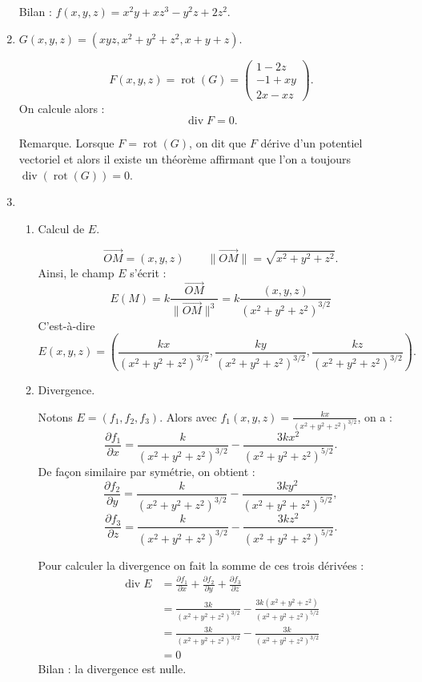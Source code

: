 \documentclass[11pt,a4paper]{article}
\theoremstyle{exostyle}
\newcommand{\diver}{\operatorname{div}}
\newcommand{\rot}{\operatorname{rot}}
\begin{document}
\begin{enumerate}
	Bilan : $f(x,y,z) = x^2y + xz^3 - y^2z + 2z^2$.
	
	\item $G(x,y,z) = (xyz, x^2+y^2+z^2, x+y+z)$. 
	
	\[
	F(x,y,z) = \rot(G) = \begin{pmatrix}
		1-2z \\ -1+xy \\ 2x-xz
	\end{pmatrix}.
	\]
	On calcule alors :
	\[\diver F = 0.\]
	
	Remarque. Lorsque $F = \rot(G)$, on dit que $F$ dérive d'un potentiel vectoriel et alors il existe un théorème affirmant que l'on a toujours $\diver (\rot(G)) = 0$.

	
	\item  
	\begin{enumerate}
		\item Calcul de $E$.
		
		\[
		\overrightarrow{OM} = (x, y, z) \qquad 
		\| \overrightarrow{OM} \| = \sqrt{x^2 + y^2 + z^2}.
		\]
		Ainsi, le champ \( E \) s'écrit :
		\[
		E(M) = k \frac{\overrightarrow{OM}}{\| \overrightarrow{OM} \|^3} = k \frac{(x, y, z)}{(x^2 + y^2 + z^2)^{3/2}}
		\]
		C'est-à-dire
		\[
		E(x, y, z) = \left( \frac{kx}{(x^2 + y^2 + z^2)^{3/2}}, \frac{ky}{(x^2 + y^2 + z^2)^{3/2}}, \frac{kz}{(x^2 + y^2 + z^2)^{3/2}} \right).
		\]
		
		\item Divergence.
		
		Notons $E = (f_1,f_2,f_3)$.
		Alors avec $f_1(x,y,z) =  \frac{kx}{(x^2 + y^2 + z^2)^{3/2}}$, on a :
		\[
		\frac{\partial f_1}{\partial x} 
		=  \frac{k}{(x^2 + y^2 + z^2)^{3/2}} - \frac{3kx^2}{(x^2 + y^2 + z^2)^{5/2}}.
		\]
		De façon similaire par symétrie, on obtient :
		\[
		\frac{\partial f_2}{\partial y} = \frac{k}{(x^2 + y^2 + z^2)^{3/2}} - \frac{3ky^2}{(x^2 + y^2 + z^2)^{5/2}},
		\]
		\[
		\frac{\partial f_3}{\partial z} = \frac{k}{(x^2 + y^2 + z^2)^{3/2}} - \frac{3kz^2}{(x^2 + y^2 + z^2)^{5/2}}.
		\]
		
		Pour calculer la divergence on fait la somme de ces trois dérivées :
		\begin{align*}
		\diver E &= 
		\frac{\partial f_1}{\partial x} + \frac{\partial f_2}{\partial y} +\frac{\partial f_3}{\partial z} \\
		&=  \frac{3k}{(x^2 + y^2 + z^2)^{3/2}} - \frac{3k(x^2+y^2+z^2)}{(x^2 + y^2 + z^2)^{5/2}} \\
		&=  \frac{3k}{(x^2 + y^2 + z^2)^{3/2}} - \frac{3k}{(x^2 + y^2 + z^2)^{3/2}} \\
		&= 0
		\end{align*}		
		Bilan : la divergence est nulle.
		

\end{enumerate}
\end{enumerate}
\end{document}
